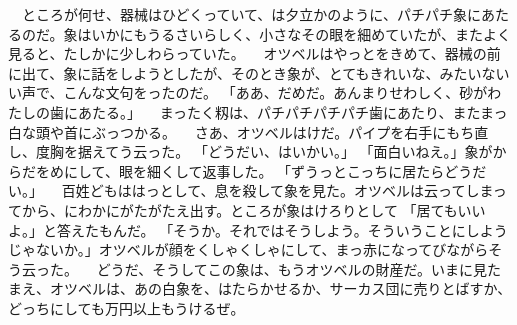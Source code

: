 　ところが何せ、器械はひどくっていて、は夕立かのように、パチパチ象にあたるのだ。象はいかにもうるさいらしく、小さなその眼を細めていたが、またよく見ると、たしかに少しわらっていた。
　オツベルはやっとをきめて、器械の前に出て、象に話をしようとしたが、そのとき象が、とてもきれいな、みたいないい声で、こんな文句をったのだ。
「ああ、だめだ。あんまりせわしく、砂がわたしの歯にあたる。」
　まったく籾は、パチパチパチパチ歯にあたり、またまっ白な頭や首にぶっつかる。
　さあ、オツベルはけだ。パイプを右手にもち直し、度胸を据えてう云った。
「どうだい、はいかい。」
「面白いねえ。」象がからだをめにして、眼を細くして返事した。
「ずうっとこっちに居たらどうだい。」
　百姓どもははっとして、息を殺して象を見た。オツベルは云ってしまってから、にわかにがたがたえ出す。ところが象はけろりとして
「居てもいいよ。」と答えたもんだ。
「そうか。それではそうしよう。そういうことにしようじゃないか。」オツベルが顔をくしゃくしゃにして、まっ赤になってびながらそう云った。
　どうだ、そうしてこの象は、もうオツベルの財産だ。いまに見たまえ、オツベルは、あの白象を、はたらかせるか、サーカス団に売りとばすか、どっちにしても万円以上もうけるぜ。
　
